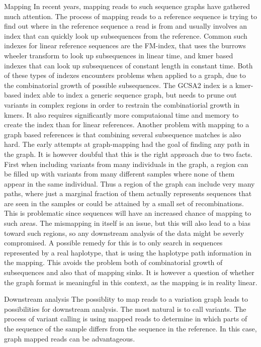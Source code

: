 Mapping
In recent years, mapping reads to such sequence graphs have gathered much attention.
The process of mapping reads to a reference sequence is trying to find out where in the reference sequence a read is from and usually involves an index that can quickly look up subsequences from the reference.
Common such indexes for linear reference sequences are the FM-index, that uses the burrows wheeler transform to look up subsequences in linear time, and kmer based indexes that can look up subsequences of constant length in constant time.
Both of these types of indexes encounters problems when applied to a graph, due to the combinatorial growth of possible subsequences.
The GCSA2 index is a kmer-based index able to index a  generic sequence graph, but needs to prune out variants in complex regions in order to restrain the combinatiorial growth in kmers.
It also requires significantly more computaional time and memory to create the index than for linear references.
Another problem with mapping to a graph based references is that combining several subsequence matches is also hard. 
The early attempts at graph-mapping had the goal of finding any path in the graph.
It is however doubful that this is the right approach due to two facts.
First when including variants from many individuals in the graph, a region can be filled up with variants from many different samples where none of them appear in the same individual.
Thus a region of the graph can include very many paths, where just a marginal fraction of them actually represents sequences that are seen in the samples or could be attained by a small set of recombinations.
This is problematic since sequences will have an increased chance of mapping to such areas.
The mismapping in itself is an issue, but this will also lead to a bias toward such regions, so any downstream analysis of the data might be severly compromised. 
A possible remedy for this is to only search in sequences represented by a real haplotype, that is using the haplotype path information in the mapping. This avoids the problem both of combinatorial growth of subsequences and also that of mapping sinks.
It is however a question of whether the graph format is meaningful in this context, as the mapping is in reality linear. 

Downstream analysis
The possiblity to map reads to a variation graph leads to possibilities for downstream analysis.
The most natural is to call variants.
The process of variant calling is using mapped reads to determine in which parts of the sequence of the sample differs from the sequence in the  reference.
In this case, graph mapped reads can be advantageous.

